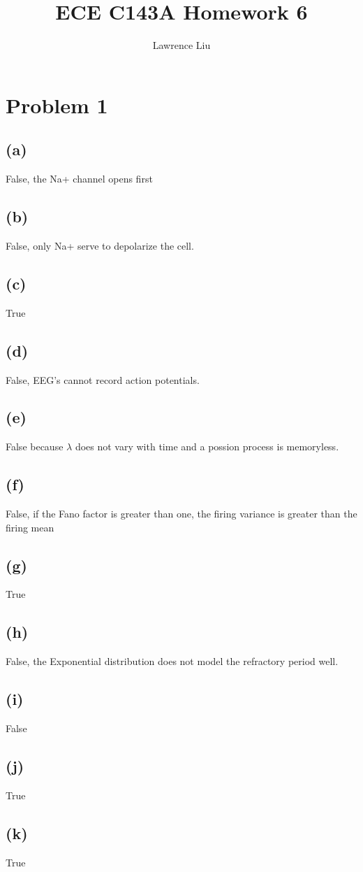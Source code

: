 \documentclass[12pt]{article}
\title{ECE C143A Homework 6}
\author{Lawrence Liu}
\begin{document}
\maketitle
\section*{Problem 1}
\subsection*{(a)}
False, the Na+ channel opens first
\subsection*{(b)}
False, only Na+ serve to depolarize the cell.
\subsection*{(c)}
True
\subsection*{(d)}
False, EEG's cannot record action potentials.
\subsection*{(e)}
False because $\lambda$ does not vary with time and a possion process is memoryless.
\subsection*{(f)}
False, if the Fano factor is greater than one, the firing variance is greater than the firing mean
\subsection*{(g)}
True
\subsection*{(h)}
False, the Exponential distribution does not model the refractory period well.
\subsection*{(i)}
False
\subsection*{(j)}
True
\subsection*{(k)}
True
\end{document}
